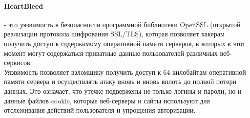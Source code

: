 \documentclass[10pt,a4paper]{report}
\begin{document}
\paragraph{HeartBleed} - это уязвимость в безопасности программной библиотеки OpenSSL (открытой реализации протокола шифрования SSL/TLS), которая позволяет хакерам получить доступ к содержимому оперативной памяти серверов, в которых в этот момент могут содержаться приватные данные пользователей различных веб-сервисов. \\
Уязвимость позволяет взломщику получить доступ к 64 килобайтам оперативной памяти сервера и осуществлять атаку вновь и вновь вплоть до полной потери данных. Это означает, что утечке подвержены не только логины и пароли, но и данные файлов cookie, которые веб-серверы и сайты используют для отслеживания действий пользователя и упрощения авторизации. 
\end{document}
